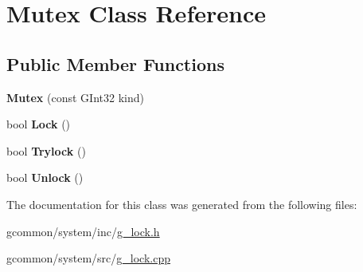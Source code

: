 \hypertarget{class_mutex}{\section{Mutex Class Reference}
\label{class_mutex}
}
\subsection*{Public Member Functions}
\begin{DoxyCompactItemize}
\item 
\hypertarget{class_mutex_a29cfd4c3ad3d2878290408d7e92d8b94}{{\bfseries Mutex} (const G\-Int32 kind)}\label{class_mutex_a29cfd4c3ad3d2878290408d7e92d8b94}

\item 
\hypertarget{class_mutex_ae520c021cd6b107ba62152ad3beecd60}{bool {\bfseries Lock} ()}\label{class_mutex_ae520c021cd6b107ba62152ad3beecd60}

\item 
\hypertarget{class_mutex_afd571c6400433b5a0c8e661cc9fce0e9}{bool {\bfseries Trylock} ()}\label{class_mutex_afd571c6400433b5a0c8e661cc9fce0e9}

\item 
\hypertarget{class_mutex_a4e0f497d5902ef4d2fcee59d2f9a57a9}{bool {\bfseries Unlock} ()}\label{class_mutex_a4e0f497d5902ef4d2fcee59d2f9a57a9}

\end{DoxyCompactItemize}


The documentation for this class was generated from the following files\-:\begin{DoxyCompactItemize}
\item 
gcommon/system/inc/\hyperlink{g__lock_8h}{g\-\_\-lock.\-h}\item 
gcommon/system/src/\hyperlink{g__lock_8cpp}{g\-\_\-lock.\-cpp}\end{DoxyCompactItemize}
